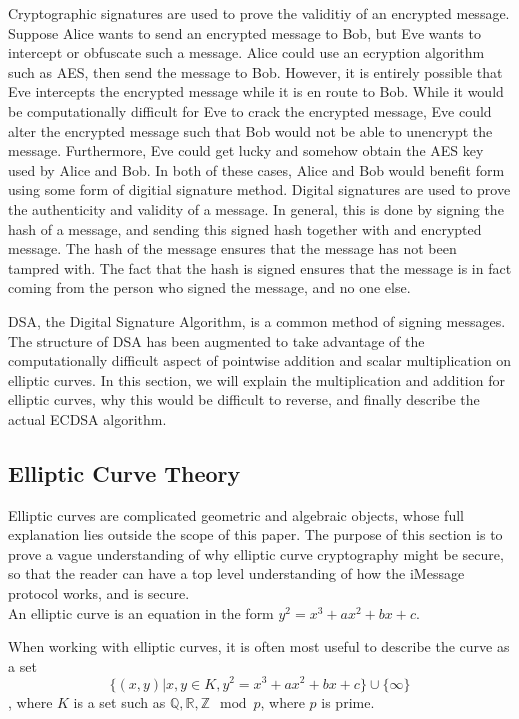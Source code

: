 Cryptographic signatures are used to prove the validitiy of an encrypted message.
Suppose Alice wants to send an encrypted message to Bob, but Eve wants to intercept
or obfuscate such a message.  Alice could use an ecryption algorithm such as AES,
then send the message to Bob.  However, it is entirely possible that Eve intercepts
the encrypted message while it is en route to Bob.  While it would be computationally
difficult for Eve to crack the encrypted message, Eve could alter the encrypted message
such that Bob would not be able to unencrypt the message. Furthermore, Eve could get lucky
and somehow obtain the AES key used by Alice and Bob. In both of these cases, Alice and Bob
would benefit form using some form of digitial signature method.  Digital signatures
are used to prove the authenticity and validity of a message.  In general, this is done by
signing the hash of a message, and sending this signed hash together with and encrypted message.
The hash of the message ensures that the message has not been
tampred with.  The fact that the hash is signed ensures that the message is in fact coming
from the person who signed the message, and no one else.

DSA, the Digital Signature Algorithm, is a common method of signing messages.
The structure of DSA has been augmented to take advantage of the
computationally difficult aspect of pointwise addition and scalar multiplication
on elliptic curves.  In this section, we will explain the multiplication
and addition for elliptic curves, why this would be difficult to reverse,
and finally describe the actual ECDSA algorithm.

\subsection{Elliptic Curve Theory}

Elliptic curves are complicated geometric and algebraic objects,
whose full explanation lies outside the scope of this paper.
The purpose of this section is to prove a vague understanding
of why elliptic curve cryptography might be secure, so that the reader
can have a top level understanding of how the iMessage protocol
works, and is secure.\\

An elliptic curve is an equation in the form $y^2 = x^3 + ax^2 + bx + c$.

When working with elliptic curves, it is often most useful to describe the curve as a set
$$\{(x,y) \vert x,y \in K, y^2 = x^3 + ax^2 + bx + c\} \cup \{ \infty \}$$, where $K$ is a set such as
$\mathbb{Q}, \mathbb{R}, \mathbb{Z} \mod p$, where $p$ is prime.

